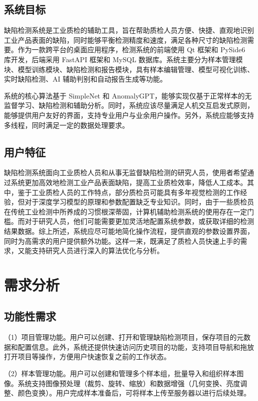\documentclass[
  ]{njuthesis}
\begin{document}
\subsection{系统目标}

缺陷检测系统是工业质检的辅助工具，旨在帮助质检人员方便、快捷、直观地识别工业产品表面的缺陷，同时能够平衡检测精度和速度，满足各种尺寸的缺陷检测需要。作为一款跨平台的桌面应用程序，检测系统的前端使用 Qt 框架和 PySide6 库开发，后端采用 FastAPI 框架和 MySQL 数据库。系统主要分为样本管理模块、模型训练模块、缺陷检测和报告模块，具有样本编辑管理、模型可视化训练、实时缺陷检测、AI 辅助判别和自动报告生成等功能。

系统的核心算法基于 SimpleNet 和 AnomalyGPT，能够实现仅基于正常样本的无监督学习、缺陷检测和辅助分析。同时，系统应该尽量满足人机交互启发式原则，能够提供用户友好的界面，支持专业用户与业余用户操作。另外，系统应能够支持多线程，同时满足一定的数据处理要求。

\subsection{用户特征}

缺陷检测系统面向工业质检人员和从事无监督缺陷检测的研究人员，使用者希望通过系统更加高效地检测工业产品表面缺陷，提高工业质检效率，降低人工成本。其中，鉴于工业质检人员的工作特点，部分质检员可能具有多年视觉检测的工作经验，但对于深度学习模型的原理和参数配置缺乏专业知识。同时，由于一些质检员在传统工业检测中所养成的习惯根深蒂固，计算机辅助检测系统的使用存在一定门槛。而对于研究人员，他们可能需要更加灵活地配置系统参数，或获取详细的检测结果数据。综上所述，系统应尽可能地简化操作流程，提供直观的参数设置界面，同时为高需求的用户提供额外功能。这样一来，既满足了质检人员快速上手的需求，又能支持研究人员进行深入的算法优化与分析。

\section{需求分析}

\subsection{功能性需求}

（1）项目管理功能。用户可以创建、打开和管理缺陷检测项目，保存项目的元数据和配置信息。此外，系统还提供快速访问历史项目的功能，支持项目导航和拖放打开项目等操作，方便用户快速恢复之前的工作状态。

（2）样本管理功能。用户可以创建和管理多个样本组，批量导入和组织样本图像。系统支持图像预处理（裁剪、旋转、缩放）和数据增强（几何变换、亮度调整、颜色变换）。用户完成样本准备后，可将样本上传至服务器以进行后续处理。
\end{document}
